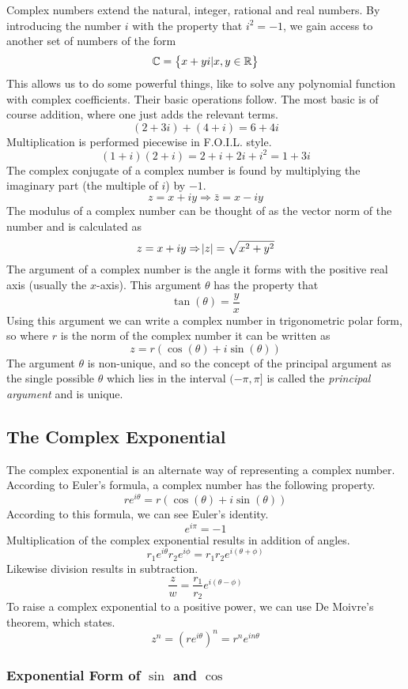 \documentclass[12pt]{report}
\newcommand{\R}{\mathbb{R}}
\newcommand{\C}{\mathbb{C}}
\begin{document}
\begin{flushleft}
Complex numbers extend the natural, integer, rational and real numbers. By 
introducing the number \(i\) with the property that \(i^2 = -1\), we gain
access to another set of numbers of the form
\[\C = \set{x + yi | x, y \in \R}\]
This allows us to do some powerful things, like to solve any polynomial
function with complex coefficients. Their basic operations follow. The most
basic is of course addition, where one just adds the relevant terms.
\[(2 + 3i) + (4 + i) = 6 + 4i\]
Multiplication is performed piecewise in F.O.I.L. style.
\[(1 + i)(2 + i) = 2 + i + 2i + i^2 = 1 + 3i\]
The complex conjugate of a complex number is found by multiplying the imaginary
part (the multiple of \(i\)) by \(-1\).
\[z = x + iy \Rightarrow \bar{z} = x - iy\]
The modulus of a complex number can be thought of as the vector norm of the
number and is calculated as
\[z = x + iy \Rightarrow \abs{z} = \sqrt{x^2 + y^2}\]
The argument of a complex number is the angle it forms with the positive real
axis (usually the \(x\)-axis). This argument \(\theta\) has the property that
\[\tan(\theta) = \frac{y}{x}\]
Using this argument we can write a complex number in trigonometric polar form,
so where \(r\) is the norm of the complex number it can be written as
\[z = r(\cos(\theta) + i\sin(\theta))\]
The argument \(\theta\) is non-unique, and so the concept of the principal 
argument as the single possible \(\theta\) which lies in the interval 
\((-\pi, \pi]\) is called the \textit{principal argument} and is unique.

\subsection*{The Complex Exponential}

The complex exponential is an alternate way of representing a complex number.
According to Euler's formula, a complex number has the following property.
\[re^{i\theta} = r(\cos(\theta) + i\sin(\theta))\]
According to this formula, we can see Euler's identity.
\[e^{i\pi} = -1\]
Multiplication of the complex exponential results in addition of angles.
\[r_1e^{i\theta}r_2e^{i\phi} = r_1r_2e^{i(\theta + \phi)}\]
Likewise division results in subtraction.
\[\frac{z}{w} = \frac{r_1}{r_2}e^{i(\theta - \phi)}\]
To raise a complex exponential to a positive power, we can use De Moivre's
theorem, which states.
\[z^n = \left(re^{i\theta}\right)^n = r^ne^{in\theta}\]

\subsubsection*{Exponential Form of \(\sin\) and \(\cos\)}


\end{flushleft}
\end{document}
